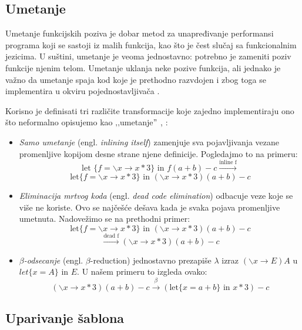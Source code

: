 \subsection{Umetanje}
Umetanje funkcijskih poziva je dobar metod za unapređivanje performansi programa koji se sastoji iz malih funkcija, kao što je čest slučaj sa funkcionalnim jezicima. U suštini, umetanje je veoma jednostavno: potrebno je zameniti poziv funkcije njenim telom. Umetanje uklanja neke pozive funkcija, ali jednako je važno da umetanje spaja kod koje je prethodno razvdojen i zbog toga se implementira u okviru pojednostavljivača \cite{compilation-by-program-transformation}.

Korisno je definisati tri različite transformacije koje zajedno implementiraju ono što neformalno opisujemo kao ‚‚umetanje$"$ \cite{secrets-haskell-compiler-inliner, compilation-by-program-transformation}, :
\begin{itemize}
	\item \textit{Samo umetanje} (engl. \textit{inlining itself}) zamenjuje sva pojavljivanja vezane promenljive kopijom desne strane njene definicije. Pogledajmo to na primeru:
	$$ \text{let } \{ f = \backslash x \longrightarrow x*3 \} \text{ in } f (a + b) - c \stackrel{\text{inline f}}{\longrightarrow} $$
	$$\text{let} \{ f = \backslash x \longrightarrow x*3 \} \text{ in } (\backslash x \longrightarrow x*3) (a + b) - c$$
	
	\item \textit{Eliminacija mrtvog koda} (engl. \textit{dead code elimination}) odbacuje veze koje se više ne koriste. Ovo se najčešće dešava kada je svaka pojava promenljive umetnuta. Nadovežimo se na prethodni primer:
	$$\text{let} \{ f = \backslash x \longrightarrow x*3 \} \text{ in } (\backslash x \longrightarrow x*3) (a + b) - c $$ 
	$$\stackrel{\text{dead f}}{\longrightarrow}  (\backslash x \longrightarrow x*3) (a + b) - c $$
	
	\item \textit{$\beta$-odsecanje} (engl. \textit{$\beta$}-reduction) jednostavno prezapiše $\lambda$ izraz $(\backslash x \longrightarrow E) A$ u $let \{x = A\} \text{ in } E$. U našem primeru to izgleda ovako:
	$$(\backslash x \longrightarrow x*3) (a + b) - c \stackrel{\beta}{\longrightarrow} (\text{let} \{ x = a+b \} \text{ in } x*3) - c$$
\end{itemize}


\subsection{Uparivanje šablona}

